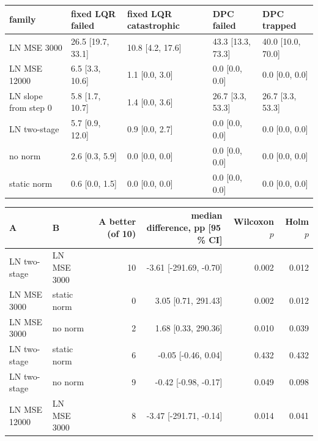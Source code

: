 \begin{tabular}{lllll}
\toprule
family & fixed LQR failed & fixed LQR catastrophic & DPC failed & DPC trapped \\
\midrule
LN MSE 3000 & 26.5 [19.7, 33.1] & 10.8 [4.2, 17.6] & 43.3 [13.3, 73.3] & 40.0 [10.0, 70.0] \\
LN MSE 12000 & 6.5 [3.3, 10.6] & 1.1 [0.0, 3.0] & 0.0 [0.0, 0.0] & 0.0 [0.0, 0.0] \\
LN slope from step 0 & 5.8 [1.7, 10.7] & 1.4 [0.0, 3.6] & 26.7 [3.3, 53.3] & 26.7 [3.3, 53.3] \\
LN two-stage & 5.7 [0.9, 12.0] & 0.9 [0.0, 2.7] & 0.0 [0.0, 0.0] & 0.0 [0.0, 0.0] \\
no norm & 2.6 [0.3, 5.9] & 0.0 [0.0, 0.0] & 0.0 [0.0, 0.0] & 0.0 [0.0, 0.0] \\
static norm & 0.6 [0.0, 1.5] & 0.0 [0.0, 0.0] & 0.0 [0.0, 0.0] & 0.0 [0.0, 0.0] \\
\bottomrule
\end{tabular}

\begin{tabular}{llrrrr}
\toprule
A & B & A better (of 10) & median difference, pp [95\,\% CI] & Wilcoxon $p$ & Holm $p$ \\
\midrule
LN two-stage & LN MSE 3000 & 10 & -3.61 [-291.69, -0.70] & 0.002 & 0.012 \\
LN MSE 3000 & static norm & 0 & 3.05 [0.71, 291.43] & 0.002 & 0.012 \\
LN MSE 3000 & no norm & 2 & 1.68 [0.33, 290.36] & 0.010 & 0.039 \\
LN two-stage & static norm & 6 & -0.05 [-0.46, 0.04] & 0.432 & 0.432 \\
LN two-stage & no norm & 9 & -0.42 [-0.98, -0.17] & 0.049 & 0.098 \\
LN MSE 12000 & LN MSE 3000 & 8 & -3.47 [-291.71, -0.14] & 0.014 & 0.041 \\
\bottomrule
\end{tabular}

